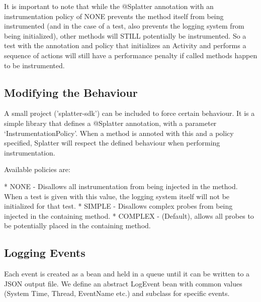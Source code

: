 It is important to note that while the @Splatter annotation with an instrumentation policy of NONE prevents the method itself from being instrumented (and in the case of a test, also prevents the logging system from being initialized), other methods will STILL potentially be instrumented. So a test with the annotation and policy that initializes an Activity and performs a sequence of actions will still have a performance penalty if called methods happen to be instrumented.

\subsection{Modifying the Behaviour}

A small project ('splatter-sdk') can be included to force certain behaviour. It is a simple library that defines a @Splatter annotation, with a parameter {\lq}InstrumentationPolicy{\rq}. When a method is annoted with this and a policy specified, Splatter will respect the defined behaviour when performing instrumentation.

Available policies are:

* NONE - Disallows all instrumentation from being injected in the method. When a test is given with this value, the logging system itself will not be initialized for that test.
* SIMPLE - Disallows complex probes from being injected in the containing method.
* COMPLEX - (Default), allows all probes to be potentially placed in the containing method.

\subsection{Logging Events}

Each event is created as a bean and held in a queue until it can be written to a JSON output file. We define an abstract LogEvent bean with common values (System Time, Thread, EventName etc.) and subclass for specific events.

